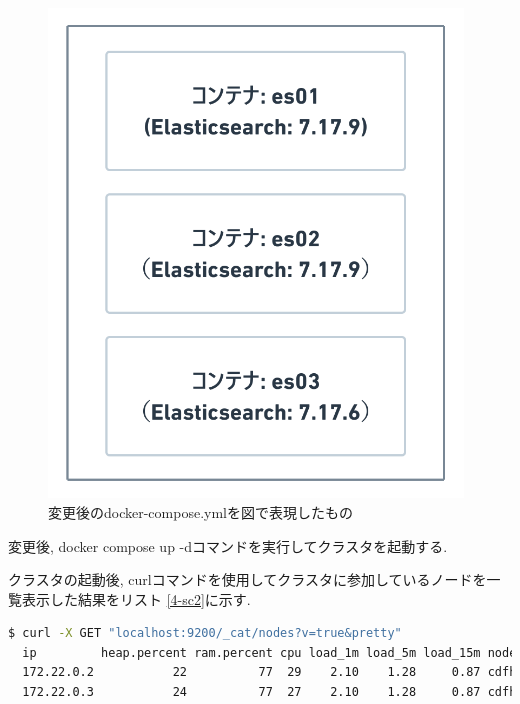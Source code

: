 \begin{figure}[H]
  \begin{center}
    \includegraphics[width=110mm]{sotu/figure/2-7.19.9-and-1-7.17.6.png}
    \caption{変更後のdocker-compose.ymlを図で表現したもの}
    \label{4-p5}
  \end{center}
\end{figure}

変更後, docker compose up -dコマンドを実行してクラスタを起動する.

クラスタの起動後, curlコマンドを使用してクラスタに参加しているノードを一覧表示した結果をリスト \ref{4-sc2}に示す.

\begin{lstlisting}[language=bash, caption=クラスタに参加しているノードを一覧表示した結果, label=4-sc2]
  $ curl -X GET "localhost:9200/_cat/nodes?v=true&pretty"
  ip         heap.percent ram.percent cpu load_1m load_5m load_15m node.role   master name
  172.22.0.2           22          77  29    2.10    1.28     0.87 cdfhilmrstw *      es01
  172.22.0.3           24          77  27    2.10    1.28     0.87 cdfhilmrstw -      es02
\end{lstlisting}

